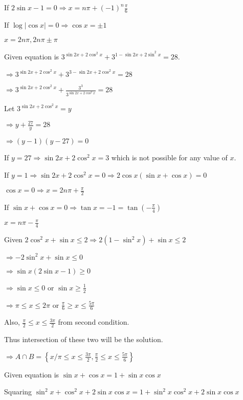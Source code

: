   If $2\sin x - 1= 0 \Rightarrow x = n\pi + (-1)^n\frac{\pi}{6}$

  If $\log|\cos x| = 0 \Rightarrow \cos x = \pm1$

  $x = 2n\pi, 2n\pi\pm\pi$

\item Given equation is $3^{\sin2x + 2\cos^2x} + 3^{1 -\sin2x + 2\sin^2x} = 28.$

  $\Rightarrow 3^{\sin2x + 2\cos^2x} + 3^{3 - \sin2x + 2\cos^2x} = 28$

  $\Rightarrow 3^{\sin2x + 2\cos^2x} + \frac{3^3}{3^{\sin2x + 2\cos^2x}} = 28$

  Let $3^{\sin2x + 2\cos^2x} = y$

  $\Rightarrow y + \frac{27}{y} = 28$

  $\Rightarrow (y - 1)(y - 27) = 0$

  If $y = 27 \Rightarrow \sin2x + 2\cos^2x = 3$ which is not possible for any value of $x.$

  If $y = 1 \Rightarrow \sin 2x + 2\cos^2x = 0 \Rightarrow 2\cos x(\sin x + \cos x) = 0$

  $\cos x = 0 \Rightarrow x = 2n\pi + \frac{\pi}{2}$

  If $\sin x + \cos x = 0 \Rightarrow \tan x = -1 = \tan\left(-\frac{\pi}{4}\right)$

  $x = n\pi - \frac{\pi}{4}$

\item Given $2\cos^2x + \sin x\leq 2 \Rightarrow 2(1 - \sin^2x) + \sin x\leq 2$

  $\Rightarrow -2\sin^2x + \sin x\leq 0$

  $\Rightarrow \sin x(2\sin x - 1)\geq 0$

  $\Rightarrow \sin x \leq 0$ or $\sin x\geq \frac{1}{2}$

  $\Rightarrow \pi \leq x \leq 2\pi$ or $\frac{\pi}{6}\geq x \leq \frac{5\pi}{6}$

  Also, $\frac{\pi}{2}\leq x\leq \frac{3\pi}{2}$ from second condition.

  Thus intersection of these two will be the solution.

  $\Rightarrow A\cap B = \left\{x/\pi\leq x\leq \frac{3\pi}{2}, \frac{\pi}{2}\leq x\leq\frac{5\pi}{6}\right\}$

\item Given equation is $\sin x + \cos x = 1 + \sin x\cos x$

  Squaring $\sin^2x + \cos^2x + 2\sin x\cos x = 1 + \sin^2x\cos^2x + 2\sin x\cos x$

